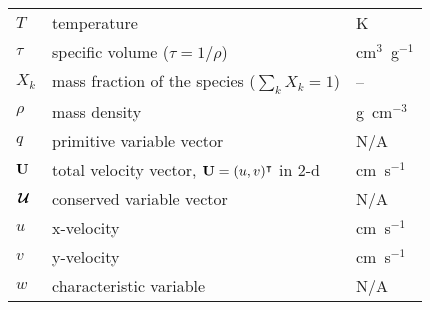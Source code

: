 \begin{center}
\begin{longtable}{|l|p{4.0in}|l|}
%
$T$     & temperature                                & K \\
%
$\tau$  & specific volume ($\tau = 1/\rho$)          & cm$^3$~g$^{-1}$ \\
%
$X_k$   & mass fraction of the species ($\sum_k X_k = 1$) & -- \\
%
$\rho$  & mass density  & g~cm$^{-3}$ \\
%
$q$     & primitive variable vector                 & N/A \\
%
${\bf U}$   & total velocity vector, ${\bf U} = (u, v)^\intercal$ in 2-d & cm~s$^{-1}$ \\
%
${\,\boldsymbol{\mathcal{U}}}$   & conserved variable vector & N/A \\
%
$u$     & x-velocity   & cm~s$^{-1}$ \\
%
$v$     & y-velocity   & cm~s$^{-1}$ \\
%
$w$     & characteristic variable                   & N/A \\
%
\end{longtable}
\end{center}
\renewcommand{\arraystretch}{1.0}


